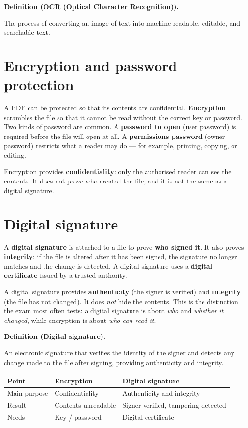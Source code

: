 \documentclass[11pt]{article}
\newenvironment{definitionbox}[1]{%
  \par\noindent\textbf{Definition (#1).}\ \itshape
}{\par\vspace{0.3em}}
\begin{document}
\begin{definitionbox}{OCR (Optical Character Recognition)}
The process of converting an image of text into machine-readable, editable,
and searchable text.
\end{definitionbox}

\section{Encryption and password protection}
A PDF can be protected so that its contents are confidential.
\textbf{Encryption} scrambles the file so that it cannot be read without the
correct key or password. Two kinds of password are common. A \textbf{password
to open} (user password) is required before the file will open at all. A
\textbf{permissions password} (owner password) restricts what a reader may
do --- for example, printing, copying, or editing.

Encryption provides \textbf{confidentiality}: only the authorised reader can
see the contents. It does not prove who created the file, and it is not the
same as a digital signature.

\section{Digital signature}
A \textbf{digital signature} is attached to a file to prove \textbf{who
signed it}. It also proves \textbf{integrity}: if the file is altered after
it has been signed, the signature no longer matches and the change is
detected. A digital signature uses a \textbf{digital certificate} issued by a
trusted authority.

A digital signature provides \textbf{authenticity} (the signer is verified)
and \textbf{integrity} (the file has not changed). It does \emph{not} hide
the contents. This is the distinction the exam most often tests: a digital
signature is about \emph{who} and \emph{whether it changed}, while encryption
is about \emph{who can read it}.

\begin{definitionbox}{Digital signature}
An electronic signature that verifies the identity of the signer and detects
any change made to the file after signing, providing authenticity and
integrity.
\end{definitionbox}

\begin{center}
\begin{tabular}{lll}
\toprule
\textbf{Point} & \textbf{Encryption} & \textbf{Digital signature} \\
\midrule
Main purpose & Confidentiality & Authenticity and integrity \\
Result & Contents unreadable & Signer verified, tampering detected \\
Needs & Key / password & Digital certificate \\
\bottomrule
\end{tabular}
\end{center}
\end{document}
